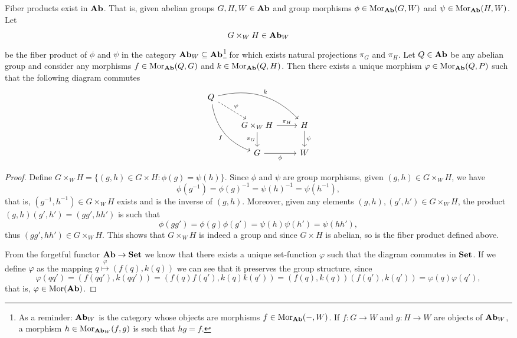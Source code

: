 \begin{proposition}
Fiber products exist in \({\textbf{Ab}}\). That is, given abelian groups \(G, H, W \in
{\textbf{Ab}}\) and group morphisms \(\phi \in \operatorname{Mor}_{\textbf{Ab}}(G, W)\) and \(\psi \in
\operatorname{Mor}_{\textbf{Ab}}(H, W)\). Let
\[
  G \times_W H \in {\textbf{Ab}}_W
\]
be the fiber product of \(\phi\) and \(\psi\) in the category \({\textbf{Ab}}_W
\subseteq {\textbf{Ab}}\)\footnote{As a reminder: \({\textbf{Ab}}_W\) is the category whose
objects are morphisms \(f \in \operatorname{Mor}_{\textbf{Ab}}(-, W)\). If \(f: G \to W\) and \(g: H
\to W\) are objects of \({\textbf{Ab}}_W\), a morphism \(h \in \operatorname{Mor}_{{\textbf{Ab}}_W}(f, g)\) is
such that \(hg = f\).} for which exists natural projections \(\pi_G\) and
\(\pi_H\). Let \(Q \in {\textbf{Ab}}\) be any abelian group and consider any morphisms \(f \in
\operatorname{Mor}_{\textbf{Ab}}(Q, G)\) and \(k \in \operatorname{Mor}_{\textbf{Ab}}(Q, H)\). Then there exists a unique
morphism \(\varphi \in \operatorname{Mor}_{\textbf{Ab}}(Q, P)\) such that the following diagram commutes
\[
  \begin{tikzcd}
    Q \ar[dr, dashed, "\varphi"] \ar[ddr, bend right, swap, "f"]
    \ar[drr, bend left, "k"]
    & & \\
    &G \times_W H \ar[r, "\pi_H"] \ar[d, swap, "\pi_G"] &H \ar[d, "\psi"] \\
    &G \ar[r, swap, "\phi"] &W
  \end{tikzcd}
\]
\end{proposition}

\begin{proof}
Define \(G \times_W H = \{(g, h) \in G \times H : \phi(g) = \psi(h)\}\). Since
\(\phi\) and \(\psi\) are group morphisms, given \((g, h) \in G \times_W H\),
we have
\[
  \phi(g^{-1}) = \phi(g)^{-1} = \psi(h)^{-1} = \psi(h^{-1}),
\]
that is, \((g^{-1}, h^{-1}) \in G \times_W H\) exists and is the inverse of
\((g, h)\). Moreover, given any elements \((g, h), (g', h') \in G \times_W H\), the
product \((g, h)(g', h') = (gg', hh')\) is such that
\[
  \phi(gg') = \phi(g) \phi(g') = \psi(h) \psi(h') = \psi(hh'),
\]
thus \((gg', hh') \in G \times_W H\). This shows that \(G \times_W H\) is
indeed a group and since \(G \times H\) is abelian, so is the fiber product
defined above.

From the forgetful functor \({\textbf{Ab}} \to {\textbf{Set}}\) we know that there exists a unique
set-function \(\varphi\) such that the diagram commutes in \({\textbf{Set}}\). If we
define \(\varphi\) as the mapping \(q \overset \varphi \longmapsto (f(q),
k(q))\) we can see that it preserves the group structure, since
\[
  \varphi(qq') = (f(qq'), k(qq')) = (f(q)f(q'), k(q)k(q'))
  = (f(q), k(q))(f(q'), k(q')) = \varphi(q) \varphi(q'),
\]
that is, \(\varphi \in \operatorname{Mor}({\textbf{Ab}})\).
\end{proof}

